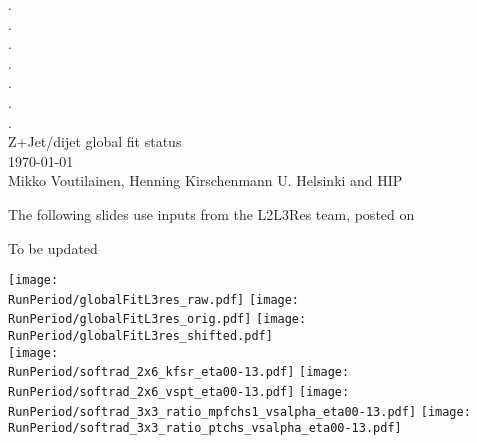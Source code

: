 \documentclass[landscape,10pt]{beamer} %
\def\RunPeriod{BCDEF}%
\begin{document}
\begin{centering}
{. }\\
{. }\\
{. }\\
{. }\\
{. }\\
{. }\\
{. }\\
Z+Jet/dijet global fit status\\
\today\\
Mikko Voutilainen, Henning Kirschenmann
U. Helsinki and HIP\\
\end{centering}
\newpage

The following slides use inputs from the L2L3Res team, posted on 
%
%


To be updated
%
%

\newpage
\texttt{[image: \\RunPeriod/globalFitL3res\_raw.pdf]}
\texttt{[image: \\RunPeriod/globalFitL3res\_orig.pdf]}
\texttt{[image: \\RunPeriod/globalFitL3res\_shifted.pdf]}\\
\texttt{[image: \\RunPeriod/softrad\_2x6\_kfsr\_eta00-13.pdf]}
\texttt{[image: \\RunPeriod/softrad\_2x6\_vspt\_eta00-13.pdf]}
\texttt{[image: \\RunPeriod/softrad\_3x3\_ratio\_mpfchs1\_vsalpha\_eta00-13.pdf]}
\texttt{[image: \\RunPeriod/softrad\_3x3\_ratio\_ptchs\_vsalpha\_eta00-13.pdf]}\\
\end{document}
